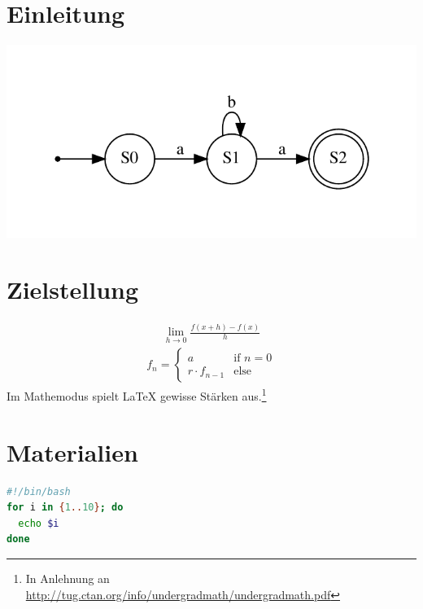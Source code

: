 \documentclass[paper=a1,pagesize,parskip=half-,fontsize=24.88pt]{scrartcl}
\begin{document}
\begin{multicols*}{3}

\section*{Einleitung}
\blindtext[1]

\includegraphics[width=\linewidth]{fsm}

\section*{Zielstellung}
\blindtext[1]
\begin{align*}
  \lim_{h\to 0}\frac{f(x+h)-f(x)}{h}
\end{align*}
\begin{align*}
    f_n=\begin{cases}
      a  & \text{if \(n=0\)} \\
      r\cdot f_{n-1} &\text{else}
    \end{cases}
\end{align*}
Im Mathemodus spielt \LaTeX{} gewisse Stärken aus.\footnote{
In Anlehnung an \url{http://tug.ctan.org/info/undergradmath/undergradmath.pdf}
}

\section*{Materialien}
\blindtext[1]

\vspace*{1cm}
\begin{lstlisting}[language=bash,caption={Ein Listing},captionpos=b,frame=tb]
#!/bin/bash
for i in {1..10}; do
  echo $i
done
\end{lstlisting}


\end{multicols*}
\end{document}
